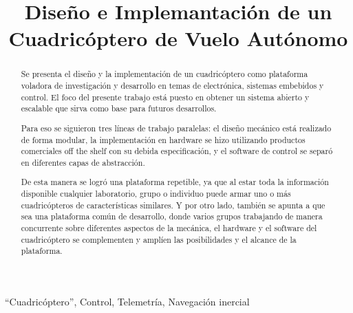 \documentclass[a4paper, conference]{IEEEtran}
\begin{document}
%
\title{Diseño e Implemantación de un Cuadricóptero de Vuelo Autónomo}


\author{
}



\maketitle


\begin{abstract}
Se presenta el diseño y la implementación de un cuadricóptero como plataforma voladora de investigación y desarrollo en temas de electrónica, sistemas embebidos y control. El foco del presente trabajo está puesto en obtener un sistema abierto y escalable que sirva como base para futuros desarrollos.

Para eso se siguieron tres líneas de trabajo paralelas: el diseño mecánico está realizado de forma modular, la implementación en hardware se hizo utilizando productos comerciales off the shelf con su debida especificación, y el software de control se separó en diferentes capas de abstracción.

De esta manera se logró una plataforma repetible, ya que al estar toda la información disponible cualquier laboratorio, grupo o individuo puede armar uno o más cuadricópteros de características similares. Y por otro lado, también se apunta a que sea una plataforma común de desarrollo, donde varios grupos trabajando de manera concurrente sobre diferentes aspectos de la mecánica, el hardware y el software del cuadricóptero se complementen y amplíen las posibilidades y el alcance de la plataforma.
\end{abstract}


\begin{IEEEkeywords}
``Cuadricóptero'', Control, Telemetría, Navegación inercial
\end{IEEEkeywords}


\IEEEpeerreviewmaketitle
\end{document}
